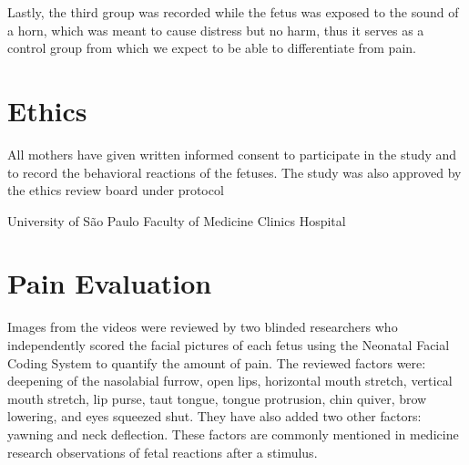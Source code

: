 Lastly, the third group was recorded while the fetus was exposed to the sound of a horn, which was meant to cause distress but no harm, thus it serves as a control group from which we expect to be able to differentiate from pain.

\section{Ethics}

All mothers have given written informed consent to participate in the study and to record the behavioral reactions of the fetuses. The study was also approved by the ethics review board under protocol 

University of São Paulo Faculty of Medicine Clinics Hospital

\section{Pain Evaluation}

Images from the videos were reviewed by two blinded researchers who independently scored the facial pictures of each fetus using the Neonatal Facial Coding System to quantify the amount of pain. The reviewed factors were: deepening of the nasolabial furrow, open lips, horizontal mouth stretch, vertical mouth stretch, lip purse, taut tongue, tongue protrusion, chin quiver, brow lowering, and eyes squeezed shut. They have also added two other factors: yawning and neck deflection. These factors are commonly mentioned in medicine research observations of fetal reactions after a stimulus.

